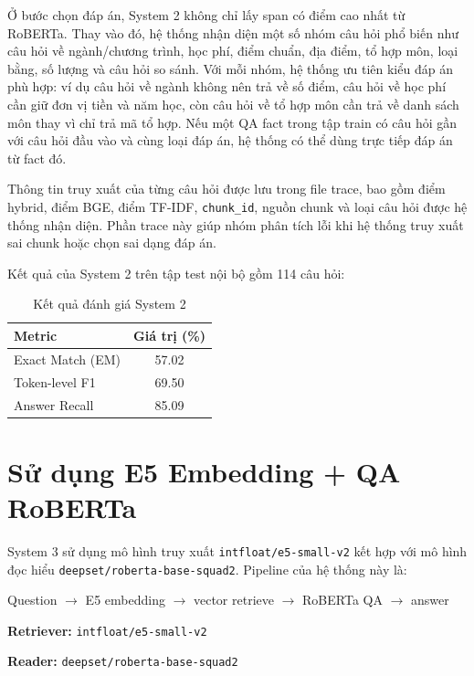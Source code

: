 \documentclass[12pt,a4paper]{report}
\begin{document}
Ở bước chọn đáp án, System 2 không chỉ lấy span có điểm cao nhất từ RoBERTa. Thay vào đó, hệ thống nhận diện một số nhóm câu hỏi phổ biến như câu hỏi về ngành/chương trình, học phí, điểm chuẩn, địa điểm, tổ hợp môn, loại bằng, số lượng và câu hỏi so sánh. Với mỗi nhóm, hệ thống ưu tiên kiểu đáp án phù hợp: ví dụ câu hỏi về ngành không nên trả về số điểm, câu hỏi về học phí cần giữ đơn vị tiền và năm học, còn câu hỏi về tổ hợp môn cần trả về danh sách môn thay vì chỉ trả mã tổ hợp. Nếu một QA fact trong tập train có câu hỏi gần với câu hỏi đầu vào và cùng loại đáp án, hệ thống có thể dùng trực tiếp đáp án từ fact đó.

Thông tin truy xuất của từng câu hỏi được lưu trong file trace, bao gồm điểm hybrid, điểm BGE, điểm TF-IDF, \texttt{chunk\_id}, nguồn chunk và loại câu hỏi được hệ thống nhận diện. Phần trace này giúp nhóm phân tích lỗi khi hệ thống truy xuất sai chunk hoặc chọn sai dạng đáp án.

Kết quả của System 2 trên tập test nội bộ gồm 114 câu hỏi:

\begin{table}[H]
\centering
\caption{Kết quả đánh giá System 2}
\begin{tabular}{|l|c|}
\hline
\textbf{Metric} & \textbf{Giá trị (\%)} \\
\hline
Exact Match (EM) & 57.02 \\
\hline
Token-level F1 & 69.50 \\
\hline
Answer Recall & 85.09 \\
\hline
\end{tabular}
\end{table}



\section{Sử dụng E5 Embedding + QA RoBERTa}

System 3 sử dụng mô hình truy xuất \texttt{intfloat/e5-small-v2} kết hợp với mô hình đọc hiểu \texttt{deepset/roberta-base-squad2}. Pipeline của hệ thống này là:

\begin{center}
Question $\rightarrow$ E5 embedding $\rightarrow$ vector retrieve $\rightarrow$ RoBERTa QA $\rightarrow$ answer
\end{center}

\textbf{Retriever:} \texttt{intfloat/e5-small-v2}

\textbf{Reader:} \texttt{deepset/roberta-base-squad2}
\end{document}
